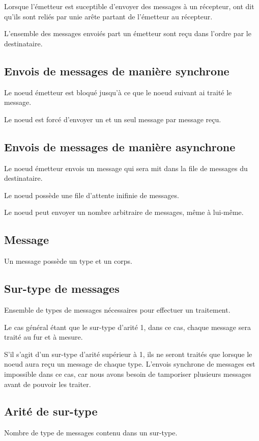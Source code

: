 \documentclass{article}
\begin{document}
Lorsque l'émetteur est suceptible d'envoyer des messages à un récepteur, ont dit
qu'ils sont reliés par unie arête partant de l'émetteur au récepteur.

L'ensemble des messages envoiés part un émetteur sont reçu dans l'ordre par
le destinataire.

\subsection{Envois de messages de manière synchrone}
Le noeud émetteur est bloqué jusqu'à ce que le noeud suivant ai traité le message.

Le noeud est forcé d'envoyer un et un seul message par message reçu.

\subsection{Envois de messages de manière asynchrone}
Le noeud émetteur envois un message qui sera mit dans la file de messages du destinataire.

Le noeud possède une file d'attente inifinie de messages.

Le noeud peut envoyer un nombre arbitraire de messages, même à lui-même.

\subsection{Message}
Un message possède un type et un corps.

\subsection{Sur-type de messages}
Ensemble de types de messages nécessaires pour effectuer un traitement.

Le cas général étant que le sur-type d'arité 1, dans ce cas, chaque
message sera traité au fur et à mesure.

S'il s'agit d'un sur-type d'arité supérieur à 1, ils ne seront traités que lorsque
le noeud aura reçu un message de chaque type.
L'envois synchrone de messages est impossible dans ce cas, car nous avons besoin
de tamporiser plusieurs messages avant de pouvoir les traiter.

\subsection{Arité de sur-type}
Nombre de type de messages contenu dans un sur-type.
\end{document}
